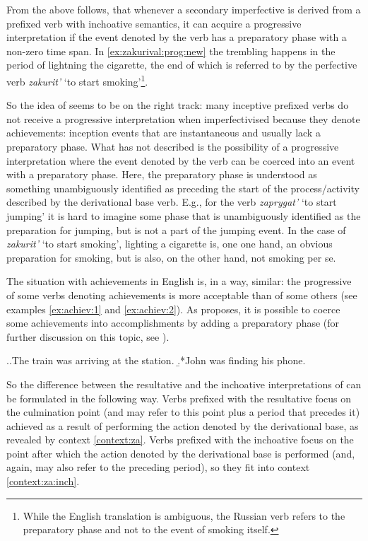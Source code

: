 From the above follows, that whenever a secondary imperfective is derived from a  prefixed verb with inchoative semantics, it can acquire a progressive interpretation if the event denoted by the verb has a preparatory phase with a non-zero time span. In \ref{ex:zakurival:prog:new} the trembling happens in the period of lightning the cigarette, the end of which is referred to by the perfective verb \textit{zakurit'} `to start smoking'\footnote{While the English translation is ambiguous, the Russian verb refers to the preparatory phase and not to the event of smoking itself.}. 

So the idea of \citet{Braginsky:08} seems to be on the right track: many inceptive prefixed verbs do not receive a progressive interpretation when imperfectivised because they denote achievements: inception events that are instantaneous and usually lack a preparatory phase. What \citet{Braginsky:08} has not described is the possibility of a progressive interpretation where the event denoted by the verb can be coerced into an event with a preparatory phase. Here, the preparatory phase is understood as something unambiguously identified as preceding the start of the process/activity described by the derivational base verb. E.g., for the verb \textit{zaprygat'} `to start jumping' it is hard to imagine some phase that is unambiguously identified as the preparation for jumping, but is not a part of the jumping event. In the case of \textit{zakurit'} `to start smoking', lighting a cigarette is, one one hand, an obvious preparation for smoking, but is also, on the other hand, not smoking per se. 

The situation with achievements in English is, in a way, similar: the progressive of some verbs denoting achievements is more acceptable than of some others (see examples \ref{ex:achiev:1} and \ref{ex:achiev:2}). As \citet{Rothstein:04} proposes, it is possible to coerce some achievements into accomplishments by adding a preparatory phase (for further discussion on this topic, see \citealt{Gyarmathy:15}).

\ex.\a.\label{ex:achiev:1}The train was arriving at the station.
\b.*John was finding his phone.\label{ex:achiev:2}

So the difference between the resultative and the inchoative interpretations of  can be formulated in the following way. Verbs prefixed with the resultative  focus on the culmination point (and may refer to this point plus a period that precedes it) achieved as a result of performing the action denoted by the derivational base, as revealed by context \ref{context:za}. Verbs prefixed with the inchoative  focus on the point after which the action denoted by the derivational base is performed (and, again, may also refer to the preceding period), so they fit into context \ref{context:za:inch}.

